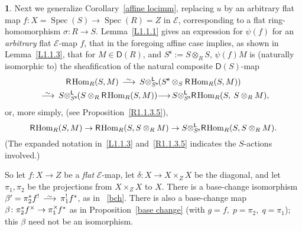 \documentclass{compositio}
\theoremstyle{plain}
\theoremstyle{definition}
\newtheorem{cosa}[thm]{}
\theoremstyle{remark}
\numberwithin{equation}{thm}
\begin{document}
\begin{cosa}\label{sigma,sigma}
Next we generalize Corollary~\ref{affine locimm}, replacing $u$ 
by an arbitrary flat map $f\colon X=\operatorname{Spec}(S)\to\operatorname{Spec}(R)=Z$ in ${\mathscr{E}}$, corresponding to a flat
ring-homomorphism $\sigma\colon R\to S$. Lemma~\ref{L1.1.1} gives an expression for $\psi(f)$ for an \emph{arbitrary} flat ${\mathscr{E}}$-map $f$, that in the foregoing affine case implies, as shown in Lemma~\ref{L1.1.3}, that for $M\in{\boldsymbol{\mathsf{D}}}(R)$,
and ${{S}^{\mathsf e}}{\!:=} S\otimes_R S$, $\psi(f)M$ is (naturally isomorphic to) the sheafification of the natural composite ${\boldsymbol{\mathsf{D}}}(S)$-map
\begin{multline*}
{\mathsf R}{\mkern-1mu}\operatorname{Hom}_R(S,M){{\mkern8mu\longrightarrow \mkern-25.5mu{}^\sim\mkern17mu}}
S{\otimes^{\mathsf L}_{{{{S}^{\mathsf e}}}}}{\mkern-1mu}({{S}^{\mathsf e}}\otimes_S{\mathsf R}{\mkern-1mu}\operatorname{Hom}_R(S,M))\\
{{\mkern8mu\longrightarrow \mkern-25.5mu{}^\sim\mkern17mu}}
S{\otimes^{\mathsf L}_{{{{S}^{\mathsf e}}}}}{\mkern-1mu}(S\otimes_R {\mathsf R}{\mkern-1mu}\operatorname{Hom}_R(S,M))
{\longrightarrow}\,
S{\otimes^{\mathsf L}_{{{{S}^{\mathsf e}}}}}{\mathsf R}{\mkern-1mu}\operatorname{Hom}_R(S,\>S\otimes_R M),
\end{multline*}
or, more simply, (see Proposition~\ref{R1.1.3.5}),
\[
{\mathsf R}{\mkern-1mu}{\mkern-1mu}\operatorname{Hom}_R(S,M) \to {\mathsf R}{\mkern-1mu}{\mkern-1mu}\operatorname{Hom}_R(S,S\otimes_R M)
\to 
S{\otimes^{\mathsf L}_{{{{S}^{\mathsf e}}}}}{\mathsf R}{\mkern-1mu}{\mkern-1mu}\operatorname{Hom}_R(S,S\otimes_R M).                                                                                                                                                                                                                                                                                                                                                                                                                                                                                                                                                        
\]
(The expanded notation in~\ref{L1.1.3} and~\ref{R1.1.3.5} indicates the $S$-actions involved.) 

So let $f:X\to Z$ be a 
\emph{flat} ${\mathscr{E}}$-map, let $\delta:X\to X\times_ZX$ be
the diagonal, and let
$\pi_1^{},\pi_2^{}$  be the projections from \mbox{$X\times_ZX$} to $X$. 
There is a base-change isomorphism $\beta'=\pi_2^*f^!{{\mkern8mu\longrightarrow \mkern-25.5mu{}^\sim\mkern17mu}}\pi_1^! f^*{\mkern-1mu}$, 
as in~ \ref{bch}.
There is also a base-change map $\beta\colon \pi_2^*f^\times\to\pi_1^\times{\mkern-1mu}{\mkern-1mu} f^*{\mkern-1mu}$  as in Proposition~\ref{base change}{\vspace{1pt}} (with $g=f,\; p=\pi_2,\; q=\pi_1$); 
this $\beta$ need not be an isomorphism.{\vspace{2pt}}


\end{cosa}
\end{document}
